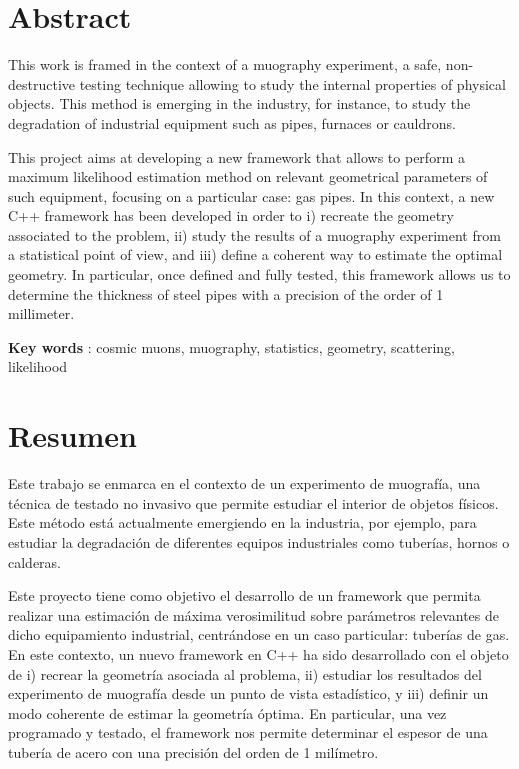 \documentclass[a4paper, 11pt, twoside, openright]{report}
\begin{document}

\clearpage
\thispagestyle{empty}
\phantom{a}
\vfill
\newpage


\setcounter{page}{1}

\section*{\huge{Abstract}}

This work is framed in the context of a muography experiment, a safe, non-destructive testing technique allowing to study the internal properties of physical objects. This method is emerging in the industry, for instance, to study the degradation of industrial equipment such as pipes, furnaces or cauldrons. 

This project aims at developing a new framework that allows to perform a maximum likelihood estimation method on relevant geometrical parameters of such equipment, focusing on a particular case: gas pipes. In this context, a new C++ framework has been developed in order to i) recreate the geometry associated to the problem, ii) study the results of a muography experiment from a statistical point of view, and iii) define a coherent way to estimate the optimal geometry. In particular, once defined and fully tested, this framework allows us to determine the thickness of steel pipes with a precision of the order of 1 millimeter.

\begin{center}
\textbf{Key words} : cosmic muons, muography, statistics, geometry, scattering, likelihood
\end{center} \vfill

\section*{\huge{Resumen}} 

Este trabajo se enmarca en el contexto de un experimento de muograf\'ia, una t\'ecnica de testado no invasivo que permite estudiar el interior de objetos f\'isicos. Este m\'etodo est\'a actualmente emergiendo en la industria, por ejemplo, para estudiar la degradaci\'on de diferentes equipos industriales como tuber\'ias, hornos o calderas. 

Este proyecto tiene como objetivo el desarrollo de un framework que permita realizar una estimaci\'on de m\'axima verosimilitud sobre par\'ametros relevantes de dicho equipamiento industrial, centr\'andose en un caso particular: tuber\'ias de gas. En este contexto, un nuevo framework en C++ ha sido desarrollado con el objeto de i) recrear la geometr\'ia asociada al problema, ii) estudiar los resultados del experimento de muograf\'ia desde un punto de vista estad\'istico, y iii) definir un modo coherente de estimar la geometr\'ia \'optima. En particular, una vez programado y testado, el framework nos permite determinar el espesor de una tuber\'ia de acero con una precisi\'on del orden de 1 mil\'imetro.
\end{document}
